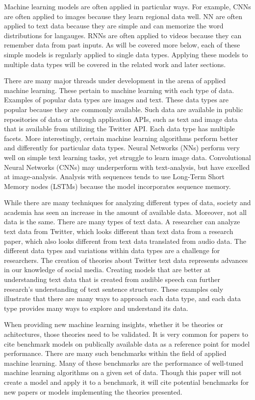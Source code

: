 Machine learning models are often applied in particular ways.  For example, CNNs are often applied to images because they learn regional data well.  NN are often applied to text data because they are simple and can memorize the word distributions for langauges.  RNNs are often applied to videos because they can remember data from past inputs.  As will be covered more below, each of these simple models is regularly applied to single data types.  Applying these models to multiple data types will be covered in the related work and later sections.  

There are many major threads under development in the arena of applied machine learning.  These pertain to machine learning with each type of data. Examples of popular data types are images and text. These data types are popular because they are commonly available.  Such data are available in public repositories of data or through application APIs, such as text and image data that is available from utilizing the Twitter API.  Each data type has multiple facets.  More interestingly, certain machine learning algorithms perform better and differently for particular data types.  Neural Networks (NNs) perform very well on simple text learning tasks, yet struggle to learn image data.  Convolutional Neural Networks (CNNs) may underperform with text-analysis, but have excelled at image-analysis.  Analysis with sequences tends to use Long-Term Short Memory nodes (LSTMs) because the model incorporates sequence memory.

While there are many techniques for analyzing different types of data, society and academia has seen an increase in the amount of available data.  Moreover, not all data is the same.  There are many types of text data.  A researcher can analyze text data from Twitter, which looks different than text data from a research paper, which also looks different from text data translated from audio data.  The different data types and variations within data types are a challenge for researchers.  The creation of theories about Twitter text data represents advances in our knowledge of social media.  Creating models that are better at understanding text data that is created from audible speech can further research's understanding of text sentence structure.  These examples only illustrate that there are many ways to approach each data type, and each data type provides many ways to explore and understand its data.

When providing new machine learning insights, whether it be theories or achitectures, those theories need to be validated.  It is very common for papers to cite benchmark models on publically available data as a reference point for model performance.  There are many such benchmarks within the field of applied machine learning.  Many of these benchmarks are the performance of well-tuned machine learning algorithms on a given set of data.  Though this paper will not create a model and apply it to a benchmark, it will cite potential benchmarks for new papers or models implementing the theories presented.


